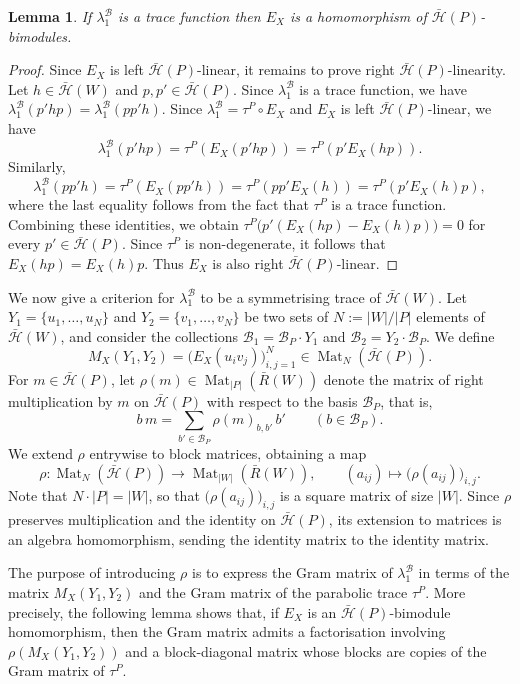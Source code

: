 \documentclass[11pt, reqno]{amsart}
\newcommand{\cB}{\mathcal{B}}
\newcommand{\cH}{\mathcal{H}}
\numberwithin{equation}{section}
\newtheorem{lemma}[theorem]{Lemma}
\theoremstyle{remark}
\begin{document}
\begin{lemma}\label{bimod}
	If $\lambda_1^{\cB}$ is a trace function then $E_X$ is a homomorphism of $\bar{\cH}(P)$-bimodules.
\end{lemma}

\begin{proof}
	Since $E_X$ is left $\bar{\cH}(P)$-linear, it remains to prove right $\bar{\cH}(P)$-linearity.
	Let $h\in\bar{\cH}(W)$ and $p,p'\in\bar{\cH}(P)$. Since $\lambda_1^{\cB}$ is a trace function, we have $\lambda_1^{\cB}(p'hp)=\lambda_1^{\cB}(pp'h)$.
	Since $\lambda_1^{\cB}=\tau^P\circ E_X$ and $E_X$ is left $\bar{\cH}(P)$-linear, we have
	$$
	\lambda_1^{\cB}(p'hp)
	=\tau^P(E_X(p'hp))
	=\tau^P(p'E_X(hp)).
	$$
	Similarly,
	$$
	\lambda_1^{\cB}(pp'h)
	=\tau^P(E_X(pp'h))
	=\tau^P(pp'E_X(h))
	=\tau^P(p'E_X(h)p),
	$$
	where the last equality follows from the fact that $\tau^P$ is a trace function.
	Combining these identities, we obtain
	$
	\tau^P\bigl(p'(E_X(hp)-E_X(h)p)\bigr)=0
	$
	for every $p'\in\bar{\cH}(P)$.
	Since $\tau^P$ is non-degenerate, it follows that
	$E_X(hp)=E_X(h)p.$
	Thus $E_X$ is also right $\bar{\cH}(P)$-linear.
\end{proof}

We now give a criterion for $\lambda_1^{\cB}$ to be a symmetrising trace of $\bar{\cH}(W)$.
Let $Y_1=\{u_1,\ldots,u_N\}$ and $Y_2=\{v_1,\ldots,v_N\}$ be two sets of $N:=|W|/|P|$ elements of $\bar{\cH}(W)$, and consider the collections $\cB_1=\cB_P\cdot Y_1$ and $\cB_2=Y_2\cdot\cB_P$. We define
\[
M_X(Y_1,Y_2)=\bigl(E_X(u_iv_j)\bigr)_{i,j=1}^N\in\operatorname{Mat}_N(\bar{\cH}(P)).
\]
For $m\in\bar{\cH}(P)$, let $\rho(m)\in\operatorname{Mat}_{|P|}(\bar R(W))$ denote the matrix of right multiplication by $m$ on $\bar{\cH}(P)$ with respect to the basis $\cB_P$, that is,
\[
b\,m=\sum_{b'\in\cB_P}\rho(m)_{b,b'}\,b' \qquad (b\in\cB_P).
\]
We extend $\rho$ entrywise to block matrices, obtaining a map
\[
\rho\colon\operatorname{Mat}_N(\bar{\cH}(P))\longrightarrow\operatorname{Mat}_{|W|}(\bar R(W)),\qquad (a_{ij})\longmapsto\bigl(\rho(a_{ij})\bigr)_{i,j}.
\]
Note that $N\cdot|P|=|W|$, so that $\bigl(\rho(a_{ij})\bigr)_{i,j}$ is a square matrix of size $|W|$. Since $\rho$ preserves multiplication and the identity on $\bar{\cH}(P)$, its extension to matrices is an algebra homomorphism, sending the identity matrix to the identity matrix.

The purpose of introducing $\rho$ is to express the Gram matrix of $\lambda_1^{\cB}$ in terms of the matrix $M_X(Y_1,Y_2)$ and the Gram matrix of the parabolic trace $\tau^P$. More precisely, the following lemma shows that, if $E_X$ is an $\bar{\cH}(P)$-bimodule homomorphism, then the Gram matrix admits a factorisation involving $\rho(M_X(Y_1,Y_2))$ and a block-diagonal matrix whose blocks are copies of the Gram matrix of $\tau^P$.
\end{document}
